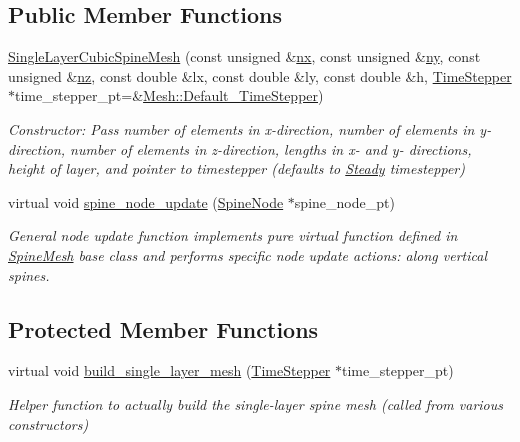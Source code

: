 \subsection*{Public Member Functions}
\begin{DoxyCompactItemize}
\item 
\hyperlink{classoomph_1_1SingleLayerCubicSpineMesh_a99a1c68b949c75b5afc9bb0eb93fec3e}{Single\+Layer\+Cubic\+Spine\+Mesh} (const unsigned \&\hyperlink{classoomph_1_1SimpleCubicMesh_ad29c917ec0adb29ad24e086e3dcd0b6f}{nx}, const unsigned \&\hyperlink{classoomph_1_1SimpleCubicMesh_a16979ec3b0e88fb37730415190021c1c}{ny}, const unsigned \&\hyperlink{classoomph_1_1SimpleCubicMesh_ad78725440e4e87598fd9339653b28e61}{nz}, const double \&lx, const double \&ly, const double \&h, \hyperlink{classoomph_1_1TimeStepper}{Time\+Stepper} $\ast$time\+\_\+stepper\+\_\+pt=\&\hyperlink{classoomph_1_1Mesh_a12243d0fee2b1fcee729ee5a4777ea10}{Mesh\+::\+Default\+\_\+\+Time\+Stepper})
\begin{DoxyCompactList}\small\item\em Constructor\+: Pass number of elements in x-\/direction, number of elements in y-\/direction, number of elements in z-\/direction, lengths in x-\/ and y-\/ directions, height of layer, and pointer to timestepper (defaults to \hyperlink{classoomph_1_1Steady}{Steady} timestepper) \end{DoxyCompactList}\item 
virtual void \hyperlink{classoomph_1_1SingleLayerCubicSpineMesh_a4851fbaed5be21441ad4f7b7f2a660e0}{spine\+\_\+node\+\_\+update} (\hyperlink{classoomph_1_1SpineNode}{Spine\+Node} $\ast$spine\+\_\+node\+\_\+pt)
\begin{DoxyCompactList}\small\item\em General node update function implements pure virtual function defined in \hyperlink{classoomph_1_1SpineMesh}{Spine\+Mesh} base class and performs specific node update actions\+: along vertical spines. \end{DoxyCompactList}\end{DoxyCompactItemize}
\subsection*{Protected Member Functions}
\begin{DoxyCompactItemize}
\item 
virtual void \hyperlink{classoomph_1_1SingleLayerCubicSpineMesh_a975e6943dbdcf2474c78261d3ec00f28}{build\+\_\+single\+\_\+layer\+\_\+mesh} (\hyperlink{classoomph_1_1TimeStepper}{Time\+Stepper} $\ast$time\+\_\+stepper\+\_\+pt)
\begin{DoxyCompactList}\small\item\em Helper function to actually build the single-\/layer spine mesh (called from various constructors) \end{DoxyCompactList}\end{DoxyCompactItemize}
